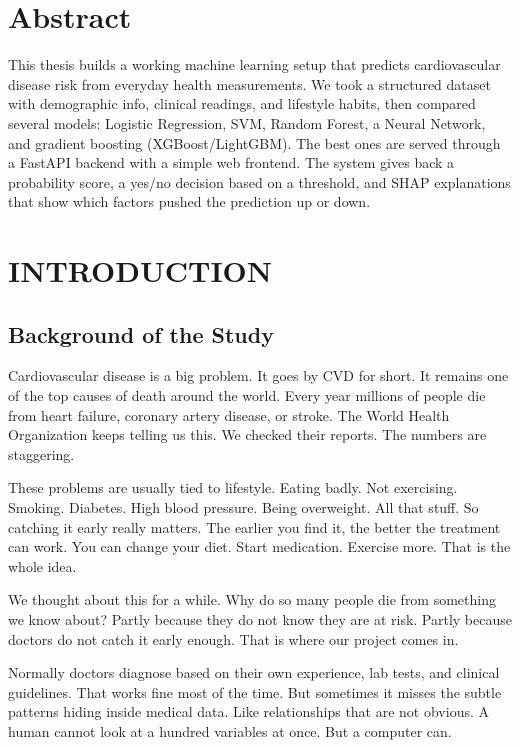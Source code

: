 \documentclass[12pt, a4paper, oneside]{book}
\begin{document}
\chapter*{Abstract}
This thesis builds a working machine learning setup that predicts cardiovascular disease risk from everyday health measurements. We took a structured dataset with demographic info, clinical readings, and lifestyle habits, then compared several models: Logistic Regression, SVM, Random Forest, a Neural Network, and gradient boosting (XGBoost/LightGBM). The best ones are served through a FastAPI backend with a simple web frontend. The system gives back a probability score, a yes/no decision based on a threshold, and SHAP explanations that show which factors pushed the prediction up or down.

\mainmatter
{}

\chapter{INTRODUCTION}

\section{Background of the Study}
Cardiovascular disease is a big problem. It goes by CVD for short. It remains one of the top causes of death around the world. Every year millions of people die from heart failure, coronary artery disease, or stroke. The World Health Organization keeps telling us this. We checked their reports. The numbers are staggering.

These problems are usually tied to lifestyle. Eating badly. Not exercising. Smoking. Diabetes. High blood pressure. Being overweight. All that stuff. So catching it early really matters. The earlier you find it, the better the treatment can work. You can change your diet. Start medication. Exercise more. That is the whole idea.

We thought about this for a while. Why do so many people die from something we know about? Partly because they do not know they are at risk. Partly because doctors do not catch it early enough. That is where our project comes in.

Normally doctors diagnose based on their own experience, lab tests, and clinical guidelines. That works fine most of the time. But sometimes it misses the subtle patterns hiding inside medical data. Like relationships that are not obvious. A human cannot look at a hundred variables at once. But a computer can.
\end{document}
